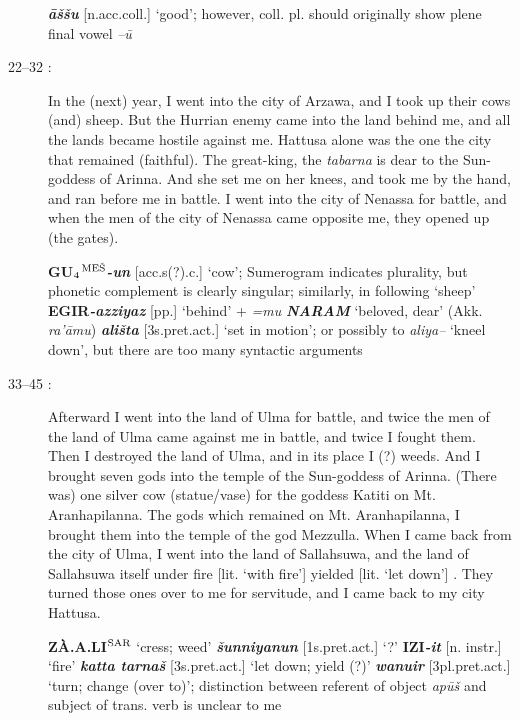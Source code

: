 \documentclass[10pt]{article}
\newcommand{\supersc}[1]{$^{\textrm{\scriptsize{#1}}}$}  	%
\newcommand{\subsc}[1]{$_{\textrm{\scriptsize{#1}}}$}	%
\newcommand{\bit}[1]{\textbf{\textit{#1}}}				%
\newcommand{\p}[1]{{\tiny[{#1}]}}					%
\newcommand{\hith}{\textsubwedge{h}}
\newcommand{\Hith}{\textsubwedge{H}}
\newcommand{\mpl}{\supersc{ME\v{S}}}
\renewcommand{\.}[1]{\textsubdot{#1}}
\begin{document}
\begin{description}
\begin{notes}

\bit{\=a\v{s}\v{s}u} \p{n.acc.coll.} `good'; however, coll. pl. should originally show plene final vowel \textit{--\=u}

\end{notes}

\item[22--32 :] In the (next) year, I went into the city of Arzawa, and I took up their cows (and) sheep. But the Hurrian enemy came into the land behind me, and all the lands became hostile against me. Hattusa alone was the one the city that remained (faithful). The great-king, the \textit{tabarna} is dear to the Sun-goddess of Arinna. And she set me on her knees, and took me by the hand, and ran before me in battle. I went into the city of Nenassa for battle, and when the men of the city of Nenassa came opposite me, they opened up (the gates). 


\begin{notes}

\textbf{GU\subsc{4}\mpl}\bit{-un} \p{acc.s(?).c.} `cow'; Sumerogram indicates plurality, but phonetic complement is clearly singular; similarly, in following `sheep' \textbf{EGIR}\bit{-azziyaz} \p{pp.} `behind' + \textit{=mu} \bit{NARAM} `beloved, dear' (Akk. \textit{ra'\=amu}) \bit{{\hith}ali\v{s}ta} \p{3s.pret.act.} `set in motion'; or possibly to \textit{{\hith}aliya--} `kneel down', but there are too many syntactic arguments 

\end{notes}

\item[33--45 :] Afterward I went into the land of Ulma for battle, and twice the men of the land of Ulma came against me in battle, and twice I fought them. Then I destroyed the land of Ulma, and in its place I (?) weeds. And I brought seven gods into the temple of the Sun-goddess of Arinna. (There was) one silver cow (statue/vase) for the goddess Katiti on Mt. Aranhapilanna. The gods which remained on Mt. Aranhapilanna, I brought them into the temple of the god Mezzulla. When I came back from the city of Ulma, I went into the land of Sallahsuwa, and the land of Sallahsuwa itself under fire [lit. `with fire'] yielded [lit. `let down'] . They turned those ones over to me for servitude, and I came back to my city Hattusa. 
  
\begin{notes}

\textbf{Z\`A.A{\Hith}.LI\supersc{SAR}} `cress; weed' \bit{\v{s}unniyanun} \p{1s.pret.act.} `?' \textbf{IZI}\bit{-it} \p{n. instr.} `fire' \bit{katta tarna\v{s}} \p{3s.pret.act.} `let down; yield (?)' \bit{wa{\hith}nuir} \p{3pl.pret.act.} `turn; change (over to)'; distinction between referent of object \textit{ap\=u\v{s}} and subject of trans. verb is unclear to me


\end{notes}
\end{description}
\end{document}
